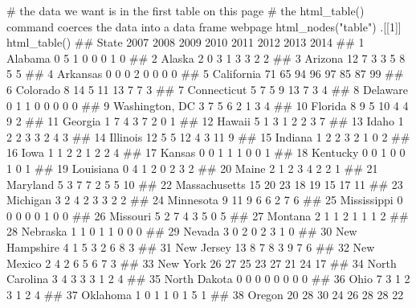 # the data we want is in the first table on this page
# the html_table() command coerces the data into a data frame
webpage %
  html_nodes("table") %
  .[[1]] %
  html_table()
##              State 2007 2008 2009 2010 2011 2012 2013 2014
## 1          Alabama    0    5    1    0    0    0    1    0
## 2           Alaska    2    0    3    1    3    3    2    2
## 3          Arizona   12    7    3    3    5    8    5    5
## 4         Arkansas    0    0    0    2    0    0    0    0
## 5       California   71   65   94   96   97   85   87   99
## 6         Colorado    8   14    5   11   13    7    7    3
## 7      Connecticut    5    7    5    9   13    7    3    4
## 8         Delaware    0    1    1    0    0    0    0    0
## 9   Washington, DC    3    7    5    6    2    1    3    4
## 10         Florida    8    9    5   10    4    4    9    2
## 11         Georgia    1    7    4    3    7    2    0    1
## 12          Hawaii    5    1    3    1    2    2    3    7
## 13           Idaho    1    2    2    3    3    2    4    3
## 14        Illinois   12    5    5   12    4    3   11    9
## 15         Indiana    1    2    2    3    2    1    0    2
## 16            Iowa    1    1    2    2    1    2    2    4
## 17          Kansas    0    0    1    1    1    0    0    1
## 18        Kentucky    0    0    1    0    0    1    0    1
## 19       Louisiana    0    4    1    2    0    2    3    2
## 20           Maine    2    1    2    3    4    2    2    1
## 21        Maryland    5    3    7    7    2    5    5   10
## 22   Massachusetts   15   20   23   18   19   15   17   11
## 23        Michigan    3    2    4    2    3    3    2    2
## 24       Minnesota    9   11    9    6    6    2    7    6
## 25     Mississippi    0    0    0    0    0    1    0    0
## 26        Missouri    5    2    7    4    3    5    0    5
## 27         Montana    2    1    1    2    1    1    1    2
## 28        Nebraska    1    1    0    1    1    0    0    0
## 29          Nevada    3    0    2    0    2    3    1    0
## 30   New Hampshire    4    1    5    3    2    6    8    3
## 31      New Jersey   13    8    7    8    3    9    7    6
## 32      New Mexico    2    4    2    6    5    6    7    3
## 33        New York   26   27   25   23   27   21   24   17
## 34  North Carolina    3    4    3    3    3    1    2    4
## 35    North Dakota    0    0    0    0    0    0    0    0
## 36            Ohio    7    3    1    2    3    1    2    4
## 37        Oklahoma    1    0    1    1    0    1    5    1
## 38          Oregon   20   28   30   24   26   28   28   22
